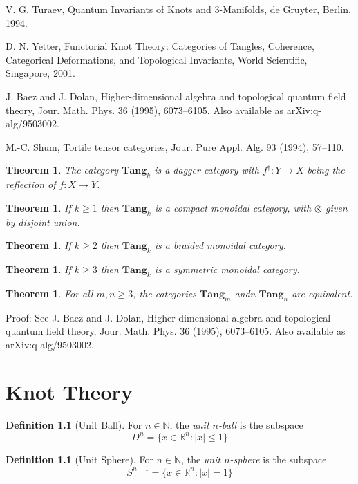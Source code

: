 \documentclass{book}
\newtheorem{thm}[lm]{Theorem}
\theoremstyle{definition}
\newtheorem{df}[lm]{Definition}
\begin{document}
V. G. Turaev, Quantum Invariants of Knots and 3-Manifolds, de Gruyter, Berlin, 
1994.

D. N. Yetter, Functorial Knot Theory: Categories of Tangles, Coherence, 
Categorical Deformations, and
Topological Invariants, World Scientific, Singapore, 2001.

J. Baez and J. Dolan, Higher-dimensional algebra and topological quantum field 
theory, Jour. Math. Phys.
36 (1995), 6073–6105. Also available as arXiv:q-alg/9503002.

M.-C. Shum, Tortile tensor categories, Jour. Pure Appl. Alg. 93 (1994), 57–110.

\begin{thm}
The category $\mathbf{Tang}_k$ is a dagger category with $f^\dagger : Y 
\rightarrow X$ being the reflection of $f : X \rightarrow Y$.
\end{thm}

\begin{thm}
If $k \geq 1$ then $\mathbf{Tang}_k$ is a compact monoidal category, with 
$\otimes$ given by disjoint 
union.
\end{thm}

\begin{thm}
If $k \geq 2$ then $\mathbf{Tang}_k$ is a braided monoidal category.
\end{thm}

\begin{thm}
If $k \geq 3$ then $\mathbf{Tang}_k$ is a symmetric monoidal category.
\end{thm}

\begin{thm}
For all $m, n \geq 3$, the categories $\mathbf{Tang}_m$ andn $\mathbf{Tang}_n$ 
are equivalent.
\end{thm}

Proof: See J. Baez and J. Dolan, Higher-dimensional algebra and topological 
quantum field theory, Jour. Math. Phys.
36 (1995), 6073–6105. Also available as arXiv:q-alg/9503002.

\chapter{Knot Theory}

\begin{df}[Unit Ball]
  For $n \in \mathbb{N}$, the \emph{unit $n$-ball} is the subspace
  \[ D^n = \{ x \in \mathbb{R}^n : |x| \leq 1 \} \]
\end{df}

\begin{df}[Unit Sphere]
  For $n \in \mathbb{N}$, the \emph{unit $n$-sphere} is the subspace
  \[ S^{n-1} = \{ x \in \mathbb{R}^n : |x| = 1 \} \]
\end{df}
\end{document}
